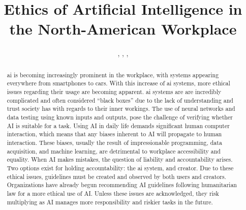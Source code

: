 \documentclass{report}
\title{Ethics of Artificial Intelligence in the North-American Workplace}
\author{\protect\censor{AAAAAAAAAAAAAA}, \protect\censor{AAAAAAAAAAAA}, \protect\censor{AAAAAAAAAAA}, \protect\censor{AAAAAAAAAAAA}}
\begin{document}

\maketitle

\setcounter{page}{2}

\tableofcontents

\newpage

\listoffigures
 
\listoftables

\printacronyms[include-classes=abbrev,name=Abbreviations]

\newpage

\acresetall


\begin{abstract}
\Ac{ai} is becoming increasingly prominent in the workplace, with systems appearing everywhere from smartphones to cars. 
With this increase of \ac{ai} systems, more ethical issues regarding their usage are becoming apparent. 
\ac{ai} systems are are incredibly complicated and often considered “black boxes” due to the lack of understanding and trust society has with regards to their inner workings. 
The use of neural networks and data testing using known inputs and outputs, pose the challenge of verifying whether AI is suitable for a task. 
Using AI in daily life demands significant  human computer interaction, which means that any biases inherent to AI will propagate to human interaction. 
These biases, usually the result of impressionable programming, data acquisition, and machine learning, are detrimental to workplace accessibility and equality. 
When AI makes mistakes, the question of liability and accountability arises. 
Two options exist for holding accountability: the \ac{ai} system, and creator. 
Due to these ethical issues, guidelines must be created and observed by both users and creators. 
Organizations have already begun recommending AI guidelines following humanitarian law for a more ethical use of AI. 
Unless these issues are acknowledged, they risk multiplying as AI manages more responsibility and riskier tasks in the future. 
\end{abstract}
\end{document}
